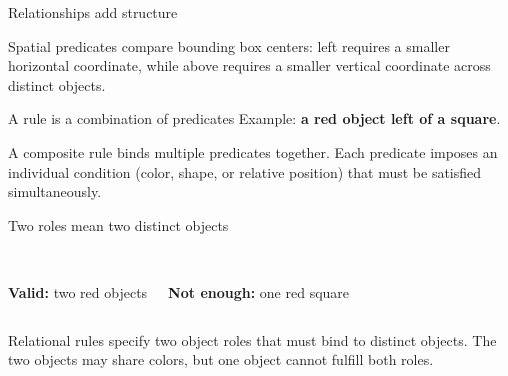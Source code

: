 \documentclass[aspectratio=169,11pt]{beamer}
\begin{document}
\begin{frame}{Relationships add structure}
\begin{center}\end{center}
\vspace{1mm}
\normalsize Spatial predicates compare bounding box centers: left requires a smaller horizontal coordinate, while above requires a smaller vertical coordinate across distinct objects.
\end{frame}

\begin{frame}{A rule is a combination of predicates}
\large Example: \textbf{a red object left of a square}.
\vspace{2mm}
\begin{center}\end{center}
\vspace{2mm}
\normalsize A composite rule binds multiple predicates together. Each predicate imposes an individual condition (color, shape, or relative position) that must be satisfied simultaneously.
\end{frame}

\begin{frame}{Two roles mean two distinct objects}
\begin{columns}
\centering
{}\\\textbf{Valid:} two red objects
\centering
{}\\\textbf{Not enough:} one red square
\end{columns}
\vspace{3mm}
\normalsize Relational rules specify two object roles that must bind to distinct objects. The two objects may share colors, but one object cannot fulfill both roles.
\end{frame}
\end{document}

